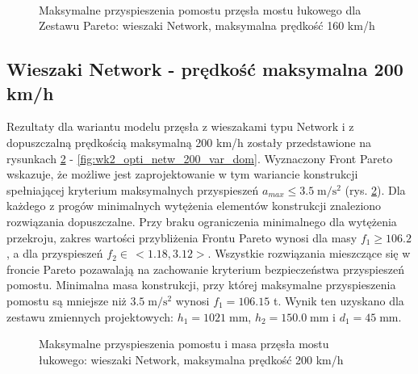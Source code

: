 \begin{figure}[hbt!]
	\centering
	\\
	\captionsetup{justification=centering}
	\caption{Maksymalne przyspieszenia pomostu przęsła mostu łukowego dla Zestawu Pareto: wieszaki Network, maksymalna prędkość 160 km/h}
	\label{fig:wk2_opti_netw_160_var_dom}
\end{figure}


\clearpage


\subsection{Wieszaki Network - prędkość maksymalna 200 km/h}

Rezultaty dla wariantu modelu przęsła z wieszakami typu Network i z dopuszczalną prędkością maksymalną 200 km/h zostały przedstawione na rysunkach \ref{fig:wk2_opti_netw_200_all} - \ref{fig:wk2_opti_netw_200_var_dom}. Wyznaczony Front Pareto wskazuje, że możliwe jest zaprojektowanie w tym wariancie konstrukcji spełniającej kryterium maksymalnych przyspieszeń $a_{max}\le 3.5\;\mathrm{m/s^2}$ (rys. \ref{fig:wk2_opti_netw_200_all}). Dla każdego z progów minimalnych wytężenia elementów konstrukcji znaleziono rozwiązania dopuszczalne. Przy braku ograniczenia minimalnego dla wytężenia przekroju, zakres wartości przybliżenia Frontu Pareto wynosi dla masy $f_1 \ge 106.2$, a dla przyspieszeń $f_2 \in\,<1.18,3.12>$. Wszystkie rozwiązania mieszczące się w froncie Pareto pozawalają na zachowanie kryterium bezpieczeństwa przyspieszeń pomostu. Minimalna masa konstrukcji, przy której maksymalne przyspieszenia pomostu są mniejsze niż $3.5\;\mathrm{m/s^2}$ wynosi $f_1 = 106.15$ t. Wynik ten uzyskano dla zestawu zmiennych projektowych: $h_1 = 1021\;\mathrm{mm}$, $h_2 = 150.0\;\mathrm{mm}$ i $d_1 = 45\;\mathrm{mm}$.


\begin{figure}[hbt!]
	\centering
	\captionsetup{justification=centering}
	\caption{Maksymalne przyspieszenia pomostu i masa przęsła mostu łukowego: wieszaki Network, maksymalna prędkość 200 km/h}
	\label{fig:wk2_opti_netw_200_all}
\end{figure}

